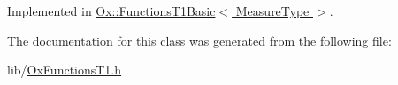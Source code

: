 Implemented in \hyperlink{class_ox_1_1_functions_t1_basic_a0bceaf2c2b424cfa2366d943d92814e3}{Ox\-::\-Functions\-T1\-Basic$<$ Measure\-Type $>$}.



The documentation for this class was generated from the following file\-:\begin{DoxyCompactItemize}
\item 
lib/\hyperlink{_ox_functions_t1_8h}{Ox\-Functions\-T1.\-h}\end{DoxyCompactItemize}
